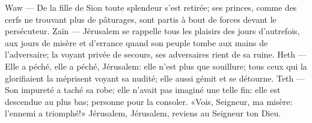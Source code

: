 Waw --- De la fille de Sion toute splendeur s’est retirée;
	ses princes, comme des cerfs ne trouvant plus de pâturages,
	sont partis à bout de forces devant le persécuteur.
Zaïn --- Jérusalem se rappelle tous les plaisirs des jours d’autrefois,
	aux jours de misère et d’errance quand son peuple tombe aux mains de l’adversaire;
	la voyant privée de secours, ses adversaires rient de sa ruine.
Heth --- Elle a péché, elle a péché, Jérusalem: elle n’est plus que souillure;
	tous ceux qui la glorifiaient la méprisent voyant sa nudité;
	elle aussi gémit et se détourne.
Teth --- Son impureté a taché sa robe; elle n’avait pas imaginé une telle fin:
	elle est descendue au plus bas; personne pour la consoler.
	«Vois, Seigneur, ma misère: l’ennemi a triomphé!»
Jérusalem, Jérusalem, reviens au Seigneur ton Dieu.
